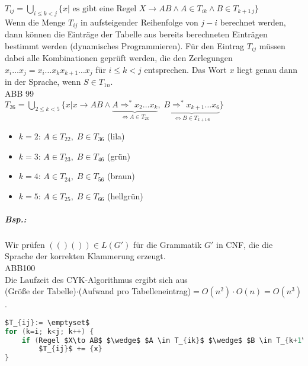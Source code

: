 $T_{ij}=\bigcup_{i\leq k<j} \{x | \text{ es gibt eine Regel }X\to AB \wedge A \in T_{ik} \wedge B\in T_{k+1\, j}\}$\\
Wenn die Menge $T_{ij}$ in aufsteigender Reihenfolge von $j-i$ berechnet werden, dann können die Einträge der Tabelle aus bereits berechneten Einträgen bestimmt werden (dynamisches Programmieren). Für den Eintrag $T_{ij}$ müssen dabei alle Kombinationen geprüft werden, die den Zerlegungen $x_i \dots x_j=x_i\dots x_k x_{k+1} \dots x_j$ für $i\leq k < j$ entsprechen. Das Wort $x$ liegt genau dann in der Sprache, wenn $S \in T_{1n}$.\\
ABB 99\\
$T_{26}=\bigcup_{2\leq k<5}\{x| x\to AB \wedge \underbrace{A \Rightarrow^* x_2\dots x_k}_{\Leftrightarrow A \in T_{2k}}, \; \underbrace{B\Rightarrow^* x_{k+1}\dots x_6}_{\Leftrightarrow B \in T_{k+1\, 6}}\}$
\begin{itemize}
\item $k=2$: $A\in T_{22},\; B \in T_{36}$ (lila)
\item $k=3$: $A \in T_{23}, \; B \in T_{46}$ (grün)
\item $k=4$: $A\in T_{24}, \; B \in T_{56}$ (braun)
\item $k=5$: $A \in T_{25}, \; B \in T_{66}$ (hellgrün)
\end{itemize}
\subparagraph{Bsp.:} Wir prüfen $(()()) \in L(G')$ für die Grammatik $G'$ in CNF, die die Sprache der korrekten Klammerung erzeugt.\\
ABB100 \\
Die Laufzeit des CYK-Algorithmus ergibt sich aus\\
(Größe der Tabelle)$\cdot$(Aufwand pro Tabelleneintrag)$=O(n^2) \cdot O(n)=O(n^3)$.
\begin{lstlisting}[language=C]
$T_{ij}:= \emptyset$
for (k=i; k<j; k++) {
	if (Regel $X\to AB$ $\wedge$ $A \in T_{ik}$ $\wedge$ $B \in T_{k+1\,j}$)
		$T_{ij}$ += {x}
}
\end{lstlisting}

